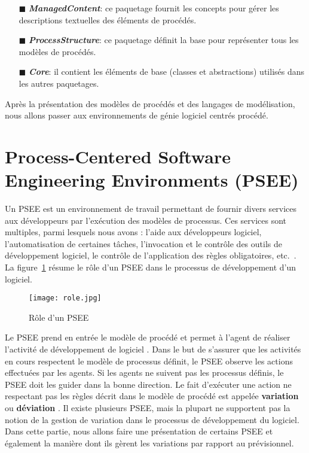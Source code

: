 \begin{itemize}
\begin{itemize}
\begin{itemize}
\item[\tiny{$\blacksquare$}] \textbf{ \textit{ManagedContent}}: ce paquetage fournit les concepts pour gérer les descriptions textuelles des éléments de procédés.
\item[\tiny{$\blacksquare$}] \textbf{ \textit{ProcessStructure}}: ce paquetage définit la base pour représenter tous les modèles de procédés.
\item[\tiny{$\blacksquare$}] \textbf{ \textit{Core}}: il contient les éléments de base (classes et abstractions) utilisés dans les autres paquetages. 
\end{itemize}
\end{itemize} 
\end{itemize}
Après la présentation des modèles de procédés et des langages de modélisation, nous allons passer aux environnements de génie logiciel centrés procédé.
\section{Process-Centered Software Engineering Environments (PSEE)}
Un PSEE est un environnement de travail permettant de fournir divers services aux développeurs par l'exécution des modèles de processus. Ces services sont multiples, parmi lesquels nous avons : l'aide aux développeurs logiciel, l'automatisation de certaines tâches, l'invocation et le contrôle des outils de développement logiciel, le contrôle de l'application des règles obligatoires, etc.~\cite{vra}. \\
La figure~\ref{rolepsee} résume le rôle d'un PSEE dans le processus de développement d'un logiciel.
\begin{figure}[h]
\centering
\texttt{[image: role.jpg]}
\caption{\label{rolepsee}Rôle d'un PSEE~\cite{alm}}
\end{figure}
\clearpage
Le PSEE prend en entrée le modèle de procédé et permet à l'agent de réaliser l'activité de \og développement de logiciel \fg{}. Dans le but de s'assurer que les activités en cours respectent le modèle de processus définit, le PSEE observe les actions effectuées par les agents. Si les agents ne suivent pas les processus définis, le PSEE doit les guider dans la bonne direction. Le fait d'exécuter une action ne respectant pas les règles décrit dans le modèle de procédé est appelée \textbf{\og variation \fg{}} ou \textbf{\og déviation \fg{}}.  
Il existe plusieurs PSEE, mais la plupart ne supportent pas la notion de la gestion de variation dans le processus de développement du logiciel. Dans cette partie, nous allons faire une présentation de certains PSEE et également la manière dont ils gèrent les variations par rapport au prévisionnel.

